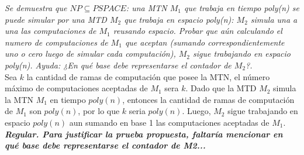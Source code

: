 \documentclass[lnbip]{svmultln}
\begin{document}
\textit{Se demuestra que $NP \subseteq  PSPACE$: una MTN $M_1$ que trabaja en tiempo poly(n) se puede simular por una MTD $M_2$ que trabaja en espacio poly(n): $M_2$ simula una a una las computaciones de $M_1$ reusando espacio. Probar que aún calculando el numero de computaciones de $M_1$ que aceptan (sumando correspondientemente uno o cero luego de simular cada computación), $M_2$ sigue trabajando en espacio poly(n). Ayuda: ¿En qué base debe representarse el contador de $M_{2}$?.} \\

Sea $k$ la cantidad de ramas de computación que posee la MTN, el número máximo de computaciones aceptadas de $M_1$ sera $k$. Dado que la MTD $M_2$ simula la MTN $M_1$ en tiempo $poly(n)$, entonces la cantidad de ramas de computación de $M_1$ son $poly(n)$, por lo que $k$ seria $poly(n)$. Luego, $M_2$ sigue trabajando en espacio $poly(n)$ aun sumando en base 1 las computaciones aceptadas de $M_1$. \\

\textbf{\textit{Regular. Para justificar la prueba propuesta, faltaría mencionar en qué base debe representarse el contador de M2...}} \\
\end{document}
